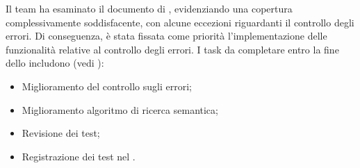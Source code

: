 \vspace{0.5\baselineskip}
\par Il team ha esaminato il documento di \AdR, evidenziando una copertura complessivamente soddisfacente, con alcune eccezioni riguardanti il controllo degli errori. Di conseguenza, è stata fissata come priorità l'implementazione delle funzionalità relative al controllo degli errori. I task da completare entro la fine dello  includono (vedi ):
\begin{itemize}
	\item Miglioramento del controllo sugli errori;
	\item Miglioramento algoritmo di ricerca semantica;
	\item Revisione dei test;
	\item Registrazione dei test nel \PdQ.
\end{itemize}